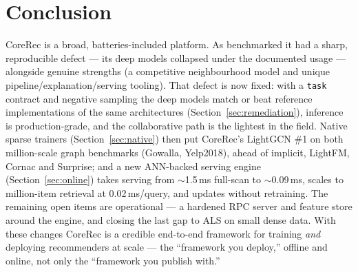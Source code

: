 \documentclass[10pt]{article}
\begin{document}
\section{Conclusion}
CoreRec is a broad, batteries-included platform. As benchmarked it had a sharp,
reproducible defect --- its deep models collapsed under the documented usage ---
alongside genuine strengths (a competitive neighbourhood model and unique
pipeline/explanation/serving tooling). That defect is now fixed: with a
\texttt{task} contract and negative sampling the deep models match or beat
reference implementations of the same architectures (Section~\ref{sec:remediation}),
inference is production-grade, and the collaborative path is the lightest in the
field. Native sparse trainers (Section~\ref{sec:native}) then put CoreRec's
LightGCN \#1 on both million-scale graph benchmarks (Gowalla, Yelp2018), ahead of
implicit, LightFM, Cornac and Surprise; and a new ANN-backed serving engine
(Section~\ref{sec:online}) takes serving from $\sim$1.5\,ms full-scan to
$\sim$0.09\,ms, scales to million-item retrieval at 0.02\,ms/query, and updates
without retraining. The remaining open items are operational --- a hardened RPC
server and feature store around the engine, and closing the last gap to ALS on
small dense data. With these changes CoreRec is a credible end-to-end framework
for training \emph{and} deploying recommenders at scale --- the ``framework you
deploy,'' offline and online, not only the ``framework you publish with.''
\end{document}
